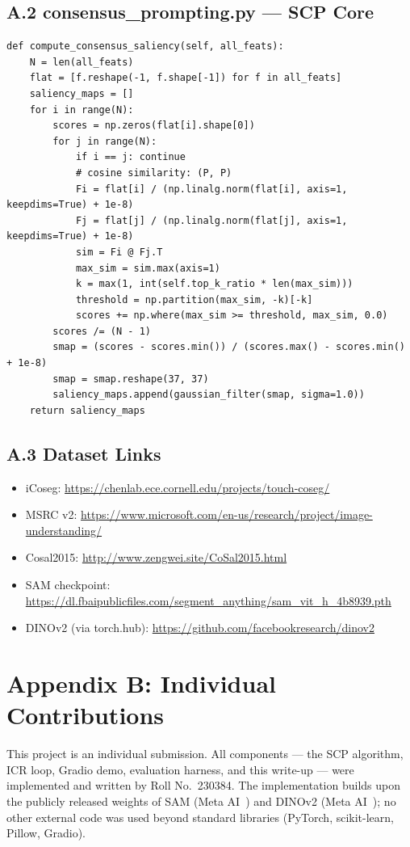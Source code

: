 \documentclass[10pt,twocolumn,letterpaper]{article}
\begin{document}
\subsection*{A.2 consensus\_prompting.py — SCP Core}
\begin{verbatim}
def compute_consensus_saliency(self, all_feats):
    N = len(all_feats)
    flat = [f.reshape(-1, f.shape[-1]) for f in all_feats]
    saliency_maps = []
    for i in range(N):
        scores = np.zeros(flat[i].shape[0])
        for j in range(N):
            if i == j: continue
            # cosine similarity: (P, P)
            Fi = flat[i] / (np.linalg.norm(flat[i], axis=1, keepdims=True) + 1e-8)
            Fj = flat[j] / (np.linalg.norm(flat[j], axis=1, keepdims=True) + 1e-8)
            sim = Fi @ Fj.T
            max_sim = sim.max(axis=1)
            k = max(1, int(self.top_k_ratio * len(max_sim)))
            threshold = np.partition(max_sim, -k)[-k]
            scores += np.where(max_sim >= threshold, max_sim, 0.0)
        scores /= (N - 1)
        smap = (scores - scores.min()) / (scores.max() - scores.min() + 1e-8)
        smap = smap.reshape(37, 37)
        saliency_maps.append(gaussian_filter(smap, sigma=1.0))
    return saliency_maps
\end{verbatim}

\subsection*{A.3 Dataset Links}
\begin{itemize}
  \item iCoseg: \url{https://chenlab.ece.cornell.edu/projects/touch-coseg/}
  \item MSRC v2: \url{https://www.microsoft.com/en-us/research/project/image-understanding/}
  \item Cosal2015: \url{http://www.zengwei.site/CoSal2015.html}
  \item SAM checkpoint: \url{https://dl.fbaipublicfiles.com/segment_anything/sam_vit_h_4b8939.pth}
  \item DINOv2 (via torch.hub): \url{https://github.com/facebookresearch/dinov2}
\end{itemize}

\section*{Appendix B: Individual Contributions}

This project is an individual submission.
All components — the SCP algorithm, ICR loop, Gradio demo, evaluation harness,
and this write-up — were implemented and written by Roll No.\ 230384.
The implementation builds upon the publicly released weights of SAM
(Meta AI~\cite{kirillov2023sam}) and DINOv2 (Meta AI~\cite{oquab2023dinov2});
no other external code was used beyond standard libraries (PyTorch, scikit-learn,
Pillow, Gradio).
\end{document}
